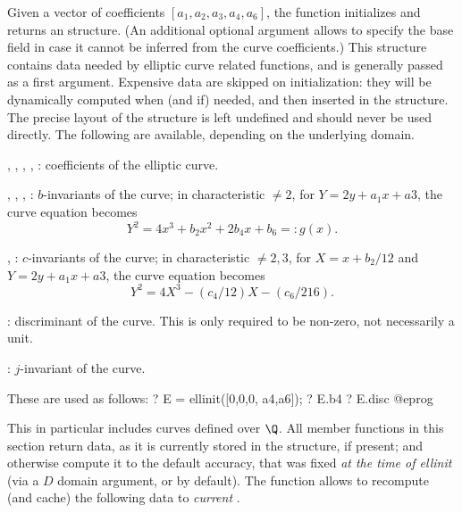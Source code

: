 Given a vector of coefficients $[a_1,a_2,a_3,a_4,a_6]$, the function
 initializes and returns an  structure. (An additional
optional argument allows to specify the base field in case it cannot be
inferred from the curve coefficients.) This structure contains data needed by
elliptic curve related functions, and is generally passed as a first argument.
Expensive data are skipped on initialization: they will be dynamically
computed when (and if) needed, and then inserted in the structure. The
precise layout of the  structure is left undefined and should never
be used directly. The following  are available,
depending on the underlying domain.


\item {}, , , , : coefficients of the
elliptic curve.

\item {}, , , : $b$-invariants of the curve; in
characteristic $\neq 2$, for $Y = 2y + a_1x+a3$, the curve equation becomes
$$ Y^2 = 4 x^3 + b_2 x^2 + 2b_4 x + b_6 =: g(x). $$

\item {}, : $c$-invariants of the curve; in characteristic $\neq
2,3$, for $X = x + b_2/12$ and $Y = 2y + a_1x+a3$, the curve equation becomes
$$ Y^2 = 4 X^3 - (c_4/12) X - (c_6/216). $$

\item {}: discriminant of the curve. This is only required to be
non-zero, not necessarily a unit.

\item {}: $j$-invariant of the curve.

\noindent These are used as follows:
\bprog
? E = ellinit([0,0,0, a4,a6]);
? E.b4
? E.disc
@eprog


This in particular includes curves defined over $\Q$. All member functions in
this section return data, as it is currently stored in the structure, if
present; and otherwise compute it to the default accuracy, that was fixed
\emph{at the time of ellinit} (via a  $D$ domain argument, or
 by default). The function  allows to
recompute (and cache) the following data to \emph{current}
.

